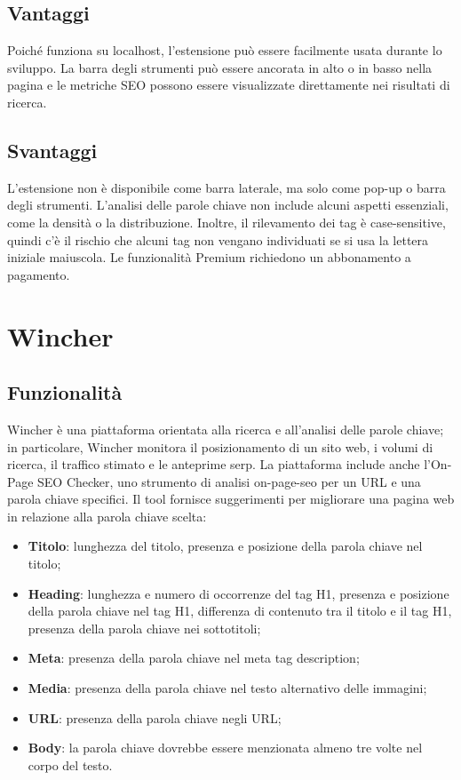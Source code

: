 \subsection{Vantaggi}
\par Poiché funziona su \gls{localhost}, l'estensione può essere facilmente usata durante lo sviluppo. La barra degli strumenti può essere ancorata in alto o in basso nella pagina e le metriche SEO possono essere visualizzate direttamente nei risultati di ricerca.

\subsection{Svantaggi}
\par L'estensione non è disponibile come barra laterale, ma solo come pop-up o barra degli strumenti. L'analisi delle parole chiave non include alcuni aspetti essenziali, come la densità o la distribuzione. Inoltre, il rilevamento dei tag è \gls{case-sensitive}, quindi c'è il rischio che alcuni tag non vengano individuati se si usa la lettera iniziale maiuscola. Le funzionalità Premium richiedono un abbonamento a pagamento. 

\section{Wincher}

\subsection{Funzionalità}
\par Wincher è una piattaforma orientata alla ricerca e all'analisi delle parole chiave; in particolare, Wincher monitora il posizionamento di un sito web, i volumi di ricerca, il traffico stimato e le anteprime \gls{serp}. La piattaforma include anche l'On-Page SEO Checker, uno strumento di analisi \gls{on-page-seo} per un URL e una parola chiave specifici. Il tool fornisce suggerimenti per migliorare una pagina web in relazione alla parola chiave scelta:
\begin{itemize}
    \item \textbf{Titolo}: lunghezza del titolo, presenza e posizione della parola chiave nel titolo;
    \item \textbf{Heading}: lunghezza e numero di occorrenze del tag H1, presenza e posizione della parola chiave nel tag H1, differenza di contenuto tra il titolo e il tag H1, presenza della parola chiave nei sottotitoli;
    \item \textbf{Meta}: presenza della parola chiave nel meta tag description;
    \item \textbf{Media}: presenza della parola chiave nel testo alternativo delle immagini;
    \item \textbf{URL}: presenza della parola chiave negli URL;
    \item \textbf{Body}: la parola chiave dovrebbe essere menzionata almeno tre volte nel corpo del testo.
\end{itemize}

